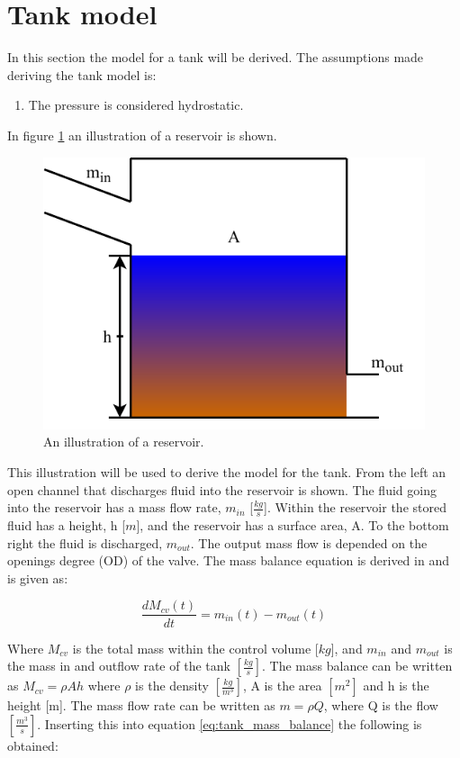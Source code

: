 \section{Tank model}\label{se:sewer_reservoir}
In this section the model for a tank will be derived. 
The assumptions made deriving the tank model is:
\begin{table}[H]
\begin{enumerate}
\item The pressure is considered hydrostatic.
\end{enumerate}
\end{table}

In figure \ref{fig:tank_model} an illustration of a reservoir is shown.
\begin{figure}[H]
\centering
\includegraphics[width=.6\textwidth]{report/modeling/pictures/reservior.pdf}
\caption{An illustration of a reservoir.}
\label{fig:tank_model}
\end{figure} 

This illustration will be used to derive the model for the tank. From the left an open channel that discharges fluid into the reservoir is shown. The fluid going into the reservoir has a mass flow rate, $m_{in}$ [$\frac{kg}{s}$]. Within the reservoir the stored fluid has a height, h [$m$], and the reservoir has a surface area, A. To the bottom right the fluid is discharged, $m_{out}$. The output mass flow is depended on the openings degree (OD) of the valve. The mass balance equation is derived in \cite{model_tank} and is given as:


\begin{equation}
	 	\frac{dM_{cv}(t)}{dt}=m_{in}(t)-m_{o ut}(t)
\label{eq:tank_mass_balance}
\end{equation} 

Where $M_{cv}$ is the total mass within the control volume [$kg$], and $m_{in}$ and $m_{out}$ is the mass in and outflow rate of the tank $\left[\frac{kg}{s}\right]$. The mass balance can be written as $M_{cv} = \rho Ah$ where $\rho$ is the density $\left[\frac{kg}{m^3}\right]$, A is the area $\left[m^2\right]$ and h is the height [m]. The mass flow rate can be written as $m = \rho Q$, where Q is the flow $\left[\frac{m^3}{s}\right]$. Inserting this into equation \ref{eq:tank_mass_balance} the following is obtained:

